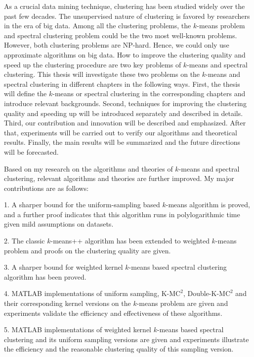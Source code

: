 
\begin{englishabstract}
As a crucial data mining technique, clustering has been studied widely over the past few decades. The unsupervised nature of clustering is favored by researchers in the era of big data. Among all the clustering problems, the $k$-means problem and spectral clustering problem could be the two most well-known problems. However, both clustering problems are NP-hard. Hence, we could only use approximate algorithms on big data. How to improve the clustering quality and speed up the clustering procedure are two key problems of $k$-means and spectral clustering. This thesis will investigate these two problems on the $k$-means and spectral clustering in different chapters in the following ways. First, the thesis will define the $k$-means or spectral clustering in the corresponding chapters and introduce relevant backgrounds. Second, techniques for improving the clustering quality and speeding up will be introduced separately and described in details. Third, our contribution and innovation will be described and emphasized. After that, experiments will be carried out to verify our algorithms and theoretical results. Finally, the main results will be summarized and the future directions will be forecasted.

Based on my research on the algorithms and theories of $k$-means and spectral clustering, relevant algorithms and theories are further improved. My major contributions are as follows:

1. A sharper bound for the uniform-sampling based $k$-means algorithm is proved, and a further proof indicates that this algorithm runs in polylogarithmic time given mild assumptions on datasets.

2. The classic $k$-means++ algorithm has been extended to weighted $k$-means problem and proofs on the clustering quality are given.

3. A sharper bound for weighted kernel $k$-means based spectral clustering algorithm has been proved.

4. MATLAB implementations of uniform sampling, K-M$\text{C}^2$, Double-K-M$\text{C}^2$ and their corresponding kernel versions on the $k$-means problem are given and experiments validate the efficiency and effectiveness of these algorithms.

5. MATLAB implementations of weighted kernel $k$-means based spectral clustering and its uniform sampling versions are given and experiments illustrate the efficiency and the reasonable clustering quality of this sampling version.


\end{englishabstract}

